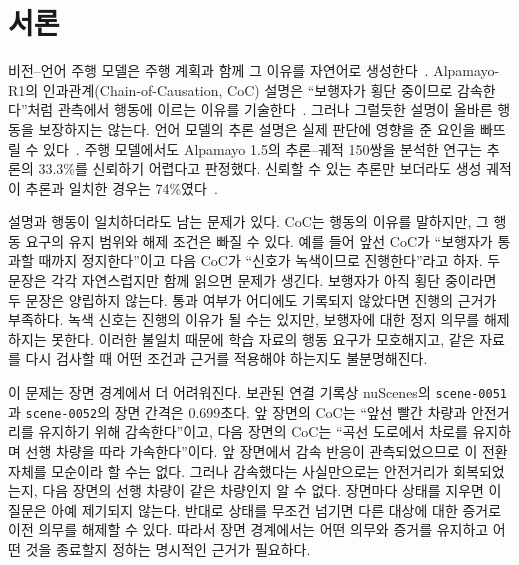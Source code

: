\section{서론}
\label{sec:intro}

\begin{revision}
비전--언어 주행 모델은 주행 계획과 함께 그 이유를 자연어로 생성한다~\cite{sima2024drivelm,tian2024drivevlm,wang2025alpamayo}. Alpamayo-R1의 인과관계(Chain-of-Causation, CoC) 설명은 ``보행자가 횡단 중이므로 감속한다''처럼 관측에서 행동에 이르는 이유를 기술한다~\cite{wang2025alpamayo,nvidia2026autolabeler}. 그러나 그럴듯한 설명이 올바른 행동을 보장하지는 않는다. 언어 모델의 추론 설명은 실제 판단에 영향을 준 요인을 빠뜨릴 수 있다~\cite{turpin2023,lanham2023}. 주행 모델에서도 Alpamayo 1.5의 추론--궤적 150쌍을 분석한 연구는 추론의 33.3\%를 신뢰하기 어렵다고 판정했다. 신뢰할 수 있는 추론만 보더라도 생성 궤적이 추론과 일치한 경우는 74\%였다~\cite{yu2026drivethoughts}.

\begin{figure}[t]
\centering
\color{revisionblue}

\label{fig:overview-pipeline}
\end{figure}

설명과 행동이 일치하더라도 남는 문제가 있다. CoC는 행동의 이유를 말하지만, 그 행동 요구의 유지 범위와 해제 조건은 빠질 수 있다. 예를 들어 앞선 CoC가 ``보행자가 통과할 때까지 정지한다''이고 다음 CoC가 ``신호가 녹색이므로 진행한다''라고 하자. 두 문장은 각각 자연스럽지만 함께 읽으면 문제가 생긴다. 보행자가 아직 횡단 중이라면 두 문장은 양립하지 않는다. 통과 여부가 어디에도 기록되지 않았다면 진행의 근거가 부족하다. 녹색 신호는 진행의 이유가 될 수는 있지만, 보행자에 대한 정지 의무를 해제하지는 못한다. 이러한 불일치 때문에 학습 자료의 행동 요구가 모호해지고, 같은 자료를 다시 검사할 때 어떤 조건과 근거를 적용해야 하는지도 불분명해진다.

이 문제는 장면 경계에서 더 어려워진다. 보관된 연결 기록상 nuScenes의 \texttt{scene-0051}과 \texttt{scene-0052}의 장면 간격은 0.699초다. 앞 장면의 CoC는 ``앞선 빨간 차량과 안전거리를 유지하기 위해 감속한다''이고, 다음 장면의 CoC는 ``곡선 도로에서 차로를 유지하며 선행 차량을 따라 가속한다''이다. 앞 장면에서 감속 반응이 관측되었으므로 이 전환 자체를 모순이라 할 수는 없다. 그러나 감속했다는 사실만으로는 안전거리가 회복되었는지, 다음 장면의 선행 차량이 같은 차량인지 알 수 없다. 장면마다 상태를 지우면 이 질문은 아예 제기되지 않는다. 반대로 상태를 무조건 넘기면 다른 대상에 대한 증거로 이전 의무를 해제할 수 있다. 따라서 장면 경계에서는 어떤 의무와 증거를 유지하고 어떤 것을 종료할지 정하는 명시적인 근거가 필요하다.


\end{revision}
